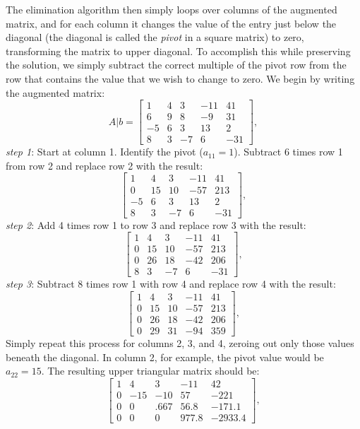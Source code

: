 \documentclass[11pt]{article}
\begin{document}
The elimination algorithm then simply loops over columns of the augmented matrix, and for each column it
changes the value of the entry just below the diagonal (the diagonal is called the {\it pivot} in a square matrix)
to zero, transforming the matrix to upper diagonal. To accomplish this while preserving the solution, we simply
subtract the correct multiple of the pivot row from the row that contains the value that we wish to change to zero.
We begin by writing the augmented matrix:
\[
A | b = 
\begin{bmatrix}
1 & 4 & 3 & -11 & 41 \\
6 & 9 & 8 & -9 & 31\\
-5 & 6 & 3 & 13 & 2\\
8 & 3 & -7 & 6 & -31 
\end{bmatrix},
\]
{\it step 1}: Start at column 1. Identify the pivot ($a_{11} = 1$). Subtract 6 times row 1 from row 2
and replace row 2 with the result:
\[
\begin{bmatrix}
1 & 4 & 3 & -11 & 41 \\
0 & 15 & 10 & -57 & 213\\
-5 & 6 & 3 & 13 & 2\\
8 & 3 & -7 & 6 & -31 
\end{bmatrix},
\]
{\it step 2}: Add 4 times row 1 to row 3 and replace row 3 with the result:
\[
\begin{bmatrix}
1 & 4 & 3 & -11 & 41 \\
0 & 15 & 10 & -57 & 213\\
0 & 26 & 18 & -42 & 206\\
8 & 3 & -7 & 6 & -31 
\end{bmatrix},
\]
{\it step 3}: Subtract 8 times row 1 with row 4 and replace row 4 with the result:
\[
\begin{bmatrix}
1 & 4 & 3 & -11 & 41 \\
0 & 15 & 10 & -57 & 213\\
0 & 26 & 18 & -42 & 206\\
0 & 29 & 31 & -94 & 359
\end{bmatrix},
\]
Simply repeat this process for columns 2, 3, and 4, zeroing out only those
values beneath the diagonal. In column 2, for example, the pivot value would
be $a_{22} = 15$. The resulting upper triangular matrix should be:
\[
\begin{bmatrix}
1 & 4 & 3 & -11 & 42 \\
0 & -15 & -10 & 57 & -221\\
0 & 0 & .667 & 56.8 & -171.1\\
0 & 0 & 0 & 977.8 & -2933.4
\end{bmatrix},
\]
\end{document}
